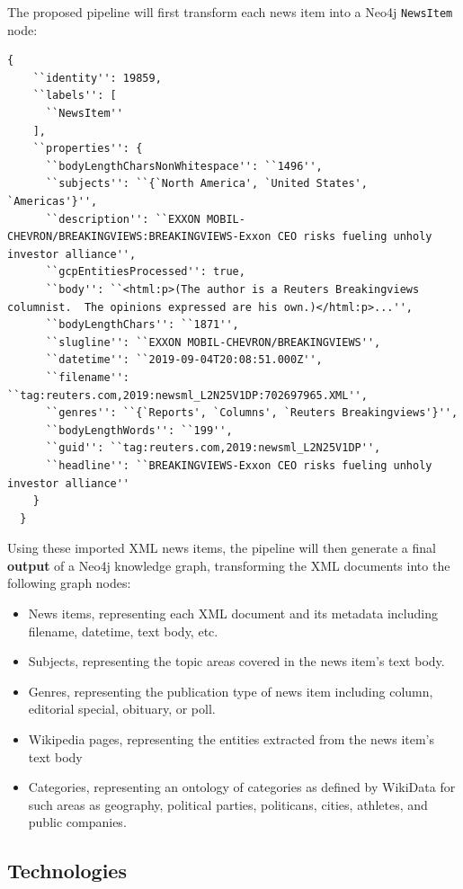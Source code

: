 \documentclass[11pt]{article}
\begin{document}
  The proposed pipeline will first transform each news item into a Neo4j \lstinline{NewsItem} node:

  \begin{lstlisting}[basicstyle=\tiny]
  {
    ``identity'': 19859,
    ``labels'': [
      ``NewsItem''
    ],
    ``properties'': {
      ``bodyLengthCharsNonWhitespace'': ``1496'',
      ``subjects'': ``{`North America', `United States', `Americas'}'',
      ``description'': ``EXXON MOBIL-CHEVRON/BREAKINGVIEWS:BREAKINGVIEWS-Exxon CEO risks fueling unholy investor alliance'',
      ``gcpEntitiesProcessed'': true,
      ``body'': ``<html:p>(The author is a Reuters Breakingviews columnist.  The opinions expressed are his own.)</html:p>...'',
      ``bodyLengthChars'': ``1871'',
      ``slugline'': ``EXXON MOBIL-CHEVRON/BREAKINGVIEWS'',
      ``datetime'': ``2019-09-04T20:08:51.000Z'',
      ``filename'': ``tag:reuters.com,2019:newsml_L2N25V1DP:702697965.XML'',
      ``genres'': ``{`Reports', `Columns', `Reuters Breakingviews'}'',
      ``bodyLengthWords'': ``199'',
      ``guid'': ``tag:reuters.com,2019:newsml_L2N25V1DP'',
      ``headline'': ``BREAKINGVIEWS-Exxon CEO risks fueling unholy investor alliance''
    }
  }
  \end{lstlisting}

  Using these imported XML news items, the pipeline will then generate a final \textbf{output} of a Neo4j knowledge graph, transforming the XML documents into the following graph nodes:
  \begin{itemize}
    \item{News items, representing each XML document and its metadata including filename, datetime, text body, etc.}
    \item{Subjects, representing the topic areas covered in the news item's text body.}
    \item{Genres, representing the publication type of news item including column, editorial special, obituary, or poll.}
    \item{Wikipedia pages, representing the entities extracted from the news item's text body}
    \item{Categories, representing an ontology of categories as defined by WikiData for such areas as geography, political parties, politicans, cities, athletes, and public companies.}
  \end{itemize}

  \subsection{Technologies}
\end{document}
